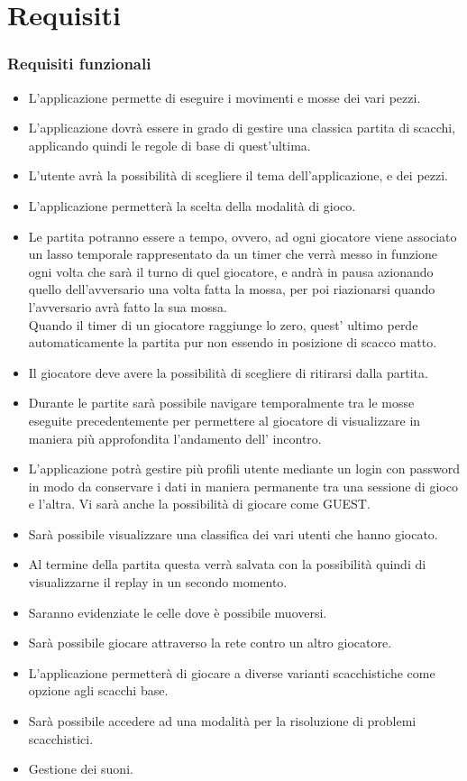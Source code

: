 \documentclass[a4paper,12pt]{report}
\begin{document}
\section{Requisiti}

\subsubsection{Requisiti funzionali}
\begin{itemize}
	\item L'applicazione permette di eseguire i movimenti e mosse dei vari pezzi.
    \item L'applicazione dovrà essere in grado di gestire una classica partita di scacchi, applicando quindi le regole di base di quest'ultima.
    \item L'utente avrà la possibilità di scegliere il tema dell'applicazione, e dei pezzi.
    \item L'applicazione permetterà la scelta della modalità di gioco.
    \item Le partita potranno essere a tempo, ovvero, ad ogni giocatore viene associato un lasso temporale rappresentato da un timer che verrà messo in funzione ogni volta che sarà il turno di quel giocatore, e andrà in pausa azionando quello dell'avversario una volta fatta la mossa, per poi riazionarsi quando l'avversario avrà fatto la sua mossa.\\Quando il timer di un giocatore raggiunge lo zero, quest' ultimo perde automaticamente la partita pur non essendo in posizione di scacco matto.
    \item Il giocatore deve avere la possibilità di scegliere di ritirarsi dalla partita.
    \item Durante le partite sarà possibile navigare temporalmente tra le mosse eseguite precedentemente per permettere al giocatore di visualizzare in maniera più approfondita l'andamento dell' incontro.
    \item L’applicazione potrà gestire più profili utente mediante un login con password in modo da conservare i dati in maniera permanente tra una sessione di gioco e l’altra. Vi sarà anche la possibilità di giocare come GUEST.
    \item Sarà possibile visualizzare una classifica dei vari utenti che hanno giocato.
    \item Al termine della partita questa verrà salvata con la possibilità quindi di visualizzarne il replay in un secondo momento.
    \item Saranno evidenziate le celle dove è possibile muoversi.
    \item Sarà possibile giocare attraverso la rete contro un altro giocatore.
    \item L'applicazione permetterà di giocare a diverse varianti scacchistiche come opzione agli scacchi base. 
    \item Sarà possibile accedere ad una modalità per la risoluzione di problemi scacchistici.
    \item Gestione dei suoni.
\end{itemize}
\end{document}
